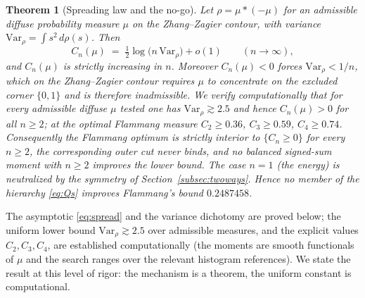 \documentclass[11pt,reqno]{amsart}
\theoremstyle{plain}
\newtheorem{theorem}{Theorem}
\theoremstyle{definition}
\begin{document}
\begin{theorem}[Spreading law and the no-go]\label{thm:nogo}
Let $\rho=\mu*(-\mu)$ for an admissible diffuse probability measure $\mu$ on the
Zhang--Zagier contour, with variance $\mathrm{Var}_\rho=\int s^2\,d\rho(s)$. Then
\begin{equation}\label{eq:spread}
  C_n(\mu)\;=\;\tfrac12\log\bigl(n\,\mathrm{Var}_\rho\bigr)+o(1)\qquad(n\to\infty),
\end{equation}
and $C_n(\mu)$ is strictly increasing in $n$. Moreover $C_n(\mu)<0$ forces
$\mathrm{Var}_\rho<1/n$, which on the Zhang--Zagier contour requires $\mu$ to
concentrate on the excluded corner $\{0,1\}$ and is therefore inadmissible. We
verify computationally that for every admissible diffuse $\mu$ tested one has
$\mathrm{Var}_\rho\gtrsim2.5$ and hence $C_n(\mu)>0$ for all $n\ge2$; at the
optimal Flammang measure $C_2\ge0.36$, $C_3\ge0.59$, $C_4\ge0.74$. Consequently the
Flammang optimum is strictly interior to $\{C_n\ge0\}$ for every $n\ge2$, the
corresponding outer cut never binds, and no balanced signed-sum moment with $n\ge2$
improves the lower bound. The case $n=1$ (the energy) is neutralized by the
symmetry of Section~\ref{subsec:twoways}. Hence no member of the hierarchy
\eqref{eq:Qs} improves Flammang's bound $0.2487458$.
\end{theorem}

\noindent The asymptotic \eqref{eq:spread} and the variance dichotomy are proved
below; the uniform lower bound $\mathrm{Var}_\rho\gtrsim2.5$ over admissible
measures, and the explicit values $C_2,C_3,C_4$, are established computationally
(the moments are smooth functionals of $\mu$ and the search ranges over the
relevant histogram references). We state the result at this level of rigor: the
mechanism is a theorem, the uniform constant is computational.
\end{document}
